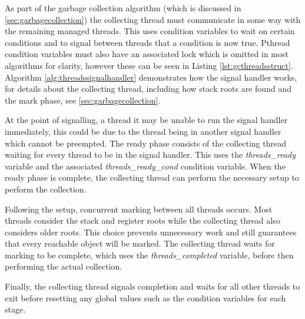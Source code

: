 \documentclass[../diss.tex]{subfiles}
\begin{document}
As part of the garbage collection algorithm (which is discussed in \cref{sec:garbagecollection}) the collecting thread must communicate in some way with the remaining managed threads. This uses condition variables to wait on certain conditions and to signal between threads that a condition is now true. Pthread condition variables must also have an associated lock which is omitted in most algorithms for clarity, however these can be seen in Listing \ref{lst:gcthreadsstruct}. Algorithm \ref{alg:threadssignalhandler} demonstrates how the signal handler works, for details about the collecting thread, including how stack roots are found and the mark phase, see \cref{sec:garbagecollection}.

At the point of signalling, a thread it may be unable to run the signal handler immediately, this could be due to the thread being in another signal handler which cannot be preempted. The ready phase consists of the collecting thread waiting for every thread to be in the signal handler. This uses the \emph{threads\_ready} variable and the associated \emph{threads\_ready\_cond} condition variable. When the ready phase is complete, the collecting thread can perform the necessary setup to perform the collection.

Following the setup, concurrent marking between all threads occurs. Most threads consider the stack and register roots while the collecting thread also considers older roots. This choice prevents unnecessary work and still guarantees that every reachable object will be marked. The collecting thread waits for marking to be complete, which uses the \emph{threads\_completed} variable, before then performing the actual collection.

Finally, the collecting thread signals completion and waits for all other threads to exit before resetting any global values such as the condition variables for each stage.
\end{document}
